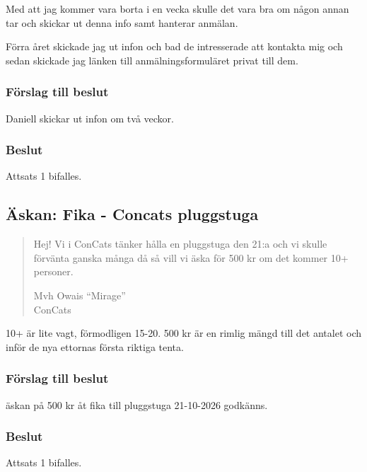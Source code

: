 \documentclass[protokoll]{dvd}
\begin{document}
Med att jag kommer vara borta i en vecka skulle det vara bra om  någon annan tar och skickar ut denna info samt hanterar anmälan. 

Förra året skickade jag ut infon och bad de intresserade att kontakta mig och sedan skickade jag länken till anmälningsformuläret privat till dem. 

\subsubsection*{Förslag till beslut}
\begin{attsatser}
    \item  Daniell skickar ut infon om två veckor. 
\end{attsatser}
\subsubsection*{Beslut}
\begin{attsatser}
    \item Attsats 1 bifalles.
\end{attsatser}

\subsection{Äskan: Fika - Concats pluggstuga}
\begin{quote}
Hej!
Vi i ConCats tänker hålla en pluggstuga den 21:a och vi skulle förvänta ganska många då så vill vi äska för 500 kr om det kommer 10+ personer.

Mvh Owais ``Mirage''\\
ConCats
\end{quote}

10+ är lite vagt, förmodligen 15-20. 500 kr är en rimlig mängd till det antalet och inför de nya ettornas första riktiga tenta. 

\subsubsection*{Förslag till beslut}
\begin{attsatser}
    \item äskan på 500 kr åt fika till pluggstuga 21-10-2026 godkänns. 
\end{attsatser}
\subsubsection*{Beslut} 
\begin{attsatser}     
\item Attsats 1 bifalles. 
\end{attsatser}
\end{document}
